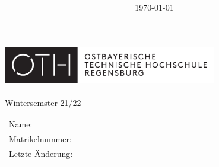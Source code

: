 \documentclass[10pt, journal]{IEEEtran}			%
\title{\FS \ \Fach}
\author{}
\date{\today}
\def\MatNr{} %
\def\Semester{Wintersemster 21/22}
\begin{document}
\begin{titlepage}
	\thispagestyle{empty}

	\begin{center}
        \includegraphics[width=0.7\textwidth]{./OTHR_OTHR_Logo.pdf}\\
		\Huge
		\textsc{\MyTitle}\\
		\normalsize
		\Semester

		{\renewcommand{\arraystretch}{1.5}
			\begin{tabular}{l l}
				Name:            & \hspace{4cm}\MyAuthor \\
				Matrikelnummer:  & \hspace{4cm}\MatNr    \\
				Letzte Änderung: & \hspace{4cm}\MyDate
			\end{tabular}
		}

	\end{center}
\end{titlepage}


\newpage







\end{document}
